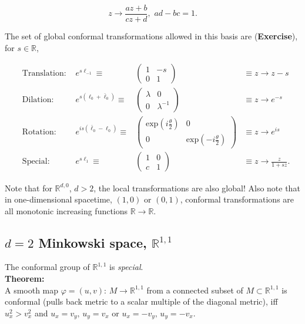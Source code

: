 \begin{equation}
z \rightarrow \frac{az + b}{c z + d}, \,\, ad-bc = 1.
\end{equation}

\noindent The set of global conformal transformations allowed in this basis are (\textbf{Exercise}), for $s \in \mathbb{R}$,

\begin{align}
&\text{Translation: } &e^{s \ell_{-1}} \equiv &\begin{pmatrix}1&-s \\ 0&1 \end{pmatrix} &\equiv z \rightarrow z - s \\
&\text{Dilation: } &e^{s (\ell_0 + \bar{\ell}_0)} \equiv &\begin{pmatrix}\lambda&0 \\ 0&\lambda^{-1} \end{pmatrix} &\equiv z \rightarrow e^{-s} \\
&\text{Rotation: } &e^{is (\bar{\ell}_0 - \ell_0)} \equiv &\begin{pmatrix}\text{exp}(i\frac{\theta}{2})&0 \\ 0&\text{exp}(-i\frac{\theta}{2}) \end{pmatrix} &\equiv z \rightarrow e^{is} \\
&\text{Special: } &e^{s \ell_1} \equiv &\begin{pmatrix}1&0 \\ c&1 \end{pmatrix} &\equiv z \rightarrow \frac{z}{1+sz}.
\end{align}

\noindent Note that for $\mathbb{R}^{d,0}$, $d>2$, the local transformations are also global! Also note that in one-dimensional spacetime, $(1,0)$ or $(0,1)$, conformal transformations are all monotonic increasing functions $\mathbb{R} \rightarrow \mathbb{R}$.

\subsection*{$d=2$ Minkowski space, $\mathbb{R}^{1,1}$}

\noindent The conformal group  of $\mathbb{R}^{1,1}$ is \textit{special}. \\

\noindent \textbf{Theorem:} \\

\noindent A smooth map $\varphi = (u,v) : \, M \rightarrow \mathbb{R}^{1,1}$ from a connected subset of $M \subset \mathbb{R}^{1,1}$ is conformal (pulls back metric to a scalar multiple of the diagonal metric), iff $u_x^2 > v_x^2$ and $u_x = v_y,\, u_y = v_x$ or $u_x = -v_y,\, u_y = -v_x$. \\

